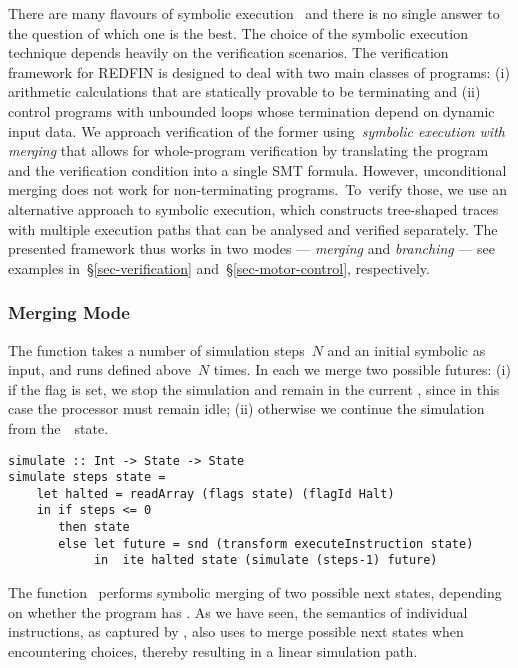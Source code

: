 There are many flavours of symbolic execution~\cite{SurveySymExec-CSUR18}
and there is no single answer to the question of which one is the best.
The choice of the symbolic execution technique depends heavily on the
verification scenarios. The verification framework for REDFIN is designed
to deal with two main classes of programs: (i) arithmetic calculations that
are statically provable to be terminating and (ii) control programs with
unbounded loops whose termination depend on dynamic input data. We approach
verification of the former using~\emph{symbolic execution with merging} that
allows for whole-program verification by translating the program and the
verification condition into a single SMT formula. However, unconditional merging
does not work for non-terminating programs.~To~verify those, we use an
alternative approach to symbolic execution, which constructs tree-shaped traces
with multiple execution paths that can be analysed and verified separately. The
presented framework thus works in two modes --- \emph{merging} and
\emph{branching} --- see examples in~\S\ref{sec-verification}
and~\S\ref{sec-motor-control}, respectively.

\subsubsection{Merging Mode}

The function  takes a number of simulation steps~$N$ and an initial
symbolic  as input, and runs  defined above~$N$
times. In each  we merge two possible futures: (i) if the 
flag is set, we stop the simulation and remain in the current ,
since in this case the processor must remain idle; (ii) otherwise we continue
the simulation from the~~state.


\begin{verbatim}
simulate :: Int -> State -> State
simulate steps state =
    let halted = readArray (flags state) (flagId Halt)
    in if steps <= 0
       then state
       else let future = snd (transform executeInstruction state)
            in  ite halted state (simulate (steps-1) future)
\end{verbatim}


\noindent
The function~ performs symbolic merging of two possible next states,
depending on whether the program has . As we have seen, the semantics
of individual instructions, as captured by , also uses
 to merge possible next states when encountering choices, thereby
resulting in a linear simulation path.

